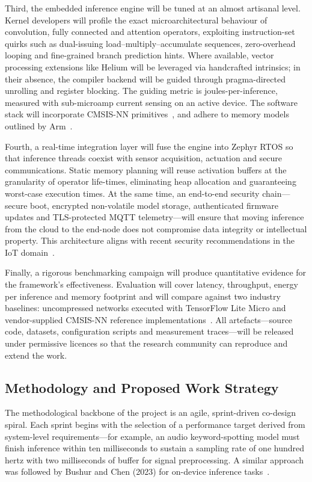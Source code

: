 Third, the embedded inference engine will be tuned at an almost artisanal level. Kernel developers will profile the exact microarchitectural behaviour of convolution, fully connected and attention operators, exploiting instruction-set quirks such as dual-issuing load–multiply–accumulate sequences, zero-overhead looping and fine-grained branch prediction hints. Where available, vector processing extensions like Helium will be leveraged via handcrafted intrinsics; in their absence, the compiler backend will be guided through pragma-directed unrolling and register blocking. The guiding metric is joules-per-inference, measured with sub-microamp current sensing on an active device. The software stack will incorporate CMSIS-NN primitives~\cite{arm2023cmsislib}, and adhere to memory models outlined by Arm~\cite{arm2023memmodel}.

Fourth, a real-time integration layer will fuse the engine into Zephyr RTOS so that inference threads coexist with sensor acquisition, actuation and secure communications. Static memory planning will reuse activation buffers at the granularity of operator life-times, eliminating heap allocation and guaranteeing worst-case execution times. At the same time, an end-to-end security chain—secure boot, encrypted non-volatile model storage, authenticated firmware updates and TLS-protected MQTT telemetry—will ensure that moving inference from the cloud to the end-node does not compromise data integrity or intellectual property. This architecture aligns with recent security recommendations in the IoT domain~\cite{embedded2024iotsecurity}.

Finally, a rigorous benchmarking campaign will produce quantitative evidence for the framework’s effectiveness. Evaluation will cover latency, throughput, energy per inference and memory footprint and will compare against two industry baselines: uncompressed networks executed with TensorFlow Lite Micro and vendor-supplied CMSIS-NN reference implementations~\cite{arm2023cmsislib}. All artefacts—source code, datasets, configuration scripts and measurement traces—will be released under permissive licences so that the research community can reproduce and extend the work.

\subsection{Methodology and Proposed Work Strategy}
The methodological backbone of the project is an agile, sprint-driven co-design spiral. Each sprint begins with the selection of a performance target derived from system-level requirements—for example, an audio keyword-spotting model must finish inference within ten milliseconds to sustain a sampling rate of one hundred hertz with two milliseconds of buffer for signal preprocessing. A similar approach was followed by Bushur and Chen (2023) for on-device inference tasks~\cite{bushur2023keyword}.


